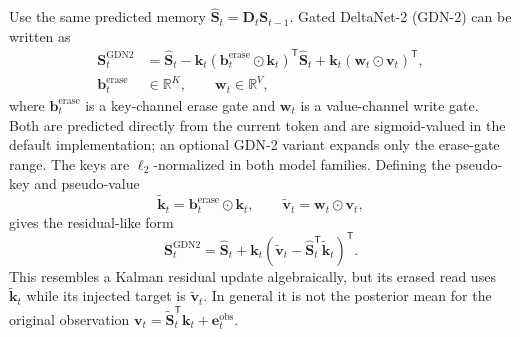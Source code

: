 \documentclass[11pt]{article}
\newcommand{\R}{\mathbb{R}}
\newcommand{\ve}[1]{\boldsymbol{#1}}
\newcommand{\tr}{\mathsf{T}}
\begin{document}
Use the same predicted memory
$\widehat{\ve{S}}_t=\ve{D}_t\ve{S}_{t-1}$.  Gated DeltaNet-2 (GDN-2) can be written as
\begin{equation}
\begin{aligned}
  \ve{S}_t^{\mathrm{GDN2}}
  &={}
    \widehat{\ve{S}}_t
    -\ve{k}_t
      (\ve{b}_t^{\mathrm{erase}}\odot\ve{k}_t)^{\tr}\widehat{\ve{S}}_t
    +\ve{k}_t(\ve{w}_t\odot\ve{v}_t)^{\tr},
  \\
  \ve{b}_t^{\mathrm{erase}}&\in\R^K,
  \qquad
  \ve{w}_t\in\R^V,
\end{aligned}
  \label{eq:gdn2-update}
\end{equation}
where $\ve{b}_t^{\mathrm{erase}}$ is a key-channel erase gate and $\ve{w}_t$ is a value-channel
write gate.  Both are predicted directly from the current token and are sigmoid-valued in the
default implementation; an optional GDN-2 variant expands only the erase-gate range.  The keys are
$\ell_2$-normalized in both model families.  Defining the pseudo-key and pseudo-value
\begin{equation}
  \widetilde{\ve{k}}_t=\ve{b}_t^{\mathrm{erase}}\odot\ve{k}_t,
  \qquad
  \widetilde{\ve{v}}_t=\ve{w}_t\odot\ve{v}_t,
  \label{eq:gdn2-pseudo-observation}
\end{equation}
gives the residual-like form
\begin{equation}
  \ve{S}_t^{\mathrm{GDN2}}
  =\widehat{\ve{S}}_t
   +\ve{k}_t
    \left(
      \widetilde{\ve{v}}_t
      -\widehat{\ve{S}}_t^{\tr}\widetilde{\ve{k}}_t
    \right)^{\tr}.
  \label{eq:gdn2-pseudo-residual}
\end{equation}
This resembles a Kalman residual update algebraically, but its erased read uses
$\widetilde{\ve{k}}_t$ while its injected target is $\widetilde{\ve{v}}_t$.  In general it is not
the posterior mean for the original observation
$\ve{v}_t=\widetilde{\ve{S}}_t^{\tr}\ve{k}_t+\ve{e}^{\mathrm{obs}}_t$.
\end{document}
